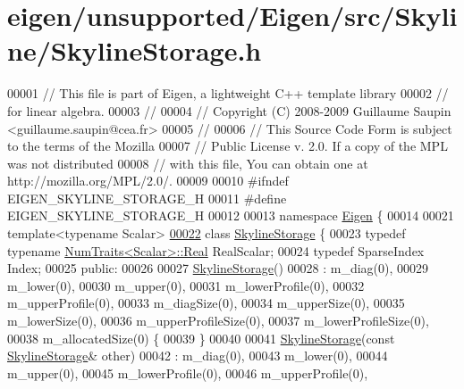 \hypertarget{eigen_2unsupported_2_eigen_2src_2_skyline_2_skyline_storage_8h_source}{}\section{eigen/unsupported/\+Eigen/src/\+Skyline/\+Skyline\+Storage.h}
\label{eigen_2unsupported_2_eigen_2src_2_skyline_2_skyline_storage_8h_source}

\begin{DoxyCode}
00001 \textcolor{comment}{// This file is part of Eigen, a lightweight C++ template library}
00002 \textcolor{comment}{// for linear algebra.}
00003 \textcolor{comment}{//}
00004 \textcolor{comment}{// Copyright (C) 2008-2009 Guillaume Saupin <guillaume.saupin@cea.fr>}
00005 \textcolor{comment}{//}
00006 \textcolor{comment}{// This Source Code Form is subject to the terms of the Mozilla}
00007 \textcolor{comment}{// Public License v. 2.0. If a copy of the MPL was not distributed}
00008 \textcolor{comment}{// with this file, You can obtain one at http://mozilla.org/MPL/2.0/.}
00009 
00010 \textcolor{preprocessor}{#ifndef EIGEN\_SKYLINE\_STORAGE\_H}
00011 \textcolor{preprocessor}{#define EIGEN\_SKYLINE\_STORAGE\_H}
00012 
00013 \textcolor{keyword}{namespace }\hyperlink{namespace_eigen}{Eigen} \{ 
00014 
00021 \textcolor{keyword}{template}<\textcolor{keyword}{typename} Scalar>
\hyperlink{class_eigen_1_1_skyline_storage}{00022} \textcolor{keyword}{class }\hyperlink{class_eigen_1_1_skyline_storage}{SkylineStorage} \{
00023     \textcolor{keyword}{typedef} \textcolor{keyword}{typename} \hyperlink{group___core___module_struct_eigen_1_1_num_traits}{NumTraits<Scalar>::Real} RealScalar;
00024     \textcolor{keyword}{typedef} SparseIndex Index;
00025 \textcolor{keyword}{public}:
00026 
00027     \hyperlink{class_eigen_1_1_skyline_storage}{SkylineStorage}()
00028     : m\_diag(0),
00029     m\_lower(0),
00030     m\_upper(0),
00031     m\_lowerProfile(0),
00032     m\_upperProfile(0),
00033     m\_diagSize(0),
00034     m\_upperSize(0),
00035     m\_lowerSize(0),
00036     m\_upperProfileSize(0),
00037     m\_lowerProfileSize(0),
00038     m\_allocatedSize(0) \{
00039     \}
00040 
00041     \hyperlink{class_eigen_1_1_skyline_storage}{SkylineStorage}(\textcolor{keyword}{const} \hyperlink{class_eigen_1_1_skyline_storage}{SkylineStorage}& other)
00042     : m\_diag(0),
00043     m\_lower(0),
00044     m\_upper(0),
00045     m\_lowerProfile(0),
00046     m\_upperProfile(0),

\end{DoxyCode}
